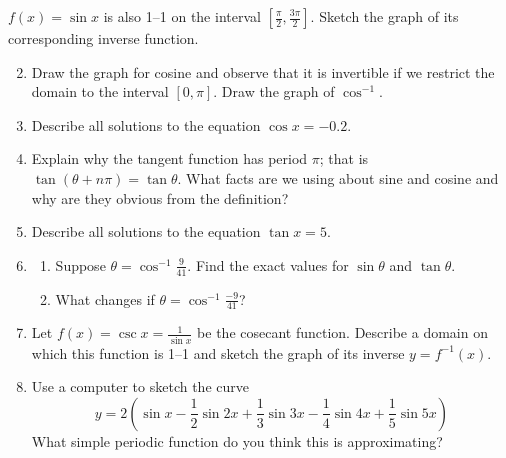 \goodbreak


\begin{exercises}
	\exstart $f(x)=\sin x$ is also 1--1 on the interval $[\frac\pi 2,\frac{3\pi}2]$. Sketch the graph of its corresponding inverse function.
	
	\begin{enumerate}\setcounter{enumi}{1}
	  \item Draw the graph for cosine and observe that it is invertible if we restrict the domain to the interval $[0,\pi]$. Draw the graph of $\cos^{-1}$.
	  
	  \item Describe all solutions to the equation $\cos x=-0.2$.
	  
	  \item Explain why the tangent function has period $\pi$; that is $\tan(\theta+n\pi)=\tan \theta$. What facts are we using about sine and cosine and why are they obvious from the definition?
	  
	  \item Describe all solutions to the equation $\tan x=5$.
	  
	  \item\begin{enumerate}
	    \item Suppose $\theta=\cos^{-1}\frac 9{41}$. Find the exact values for $\sin\theta$ and $\tan\theta$.
	    \item What changes if $\theta=\cos^{-1}\frac{-9}{41}$?
	  \end{enumerate} 
	  
	  \item Let $f(x)=\csc x=\frac 1{\sin x}$ be the cosecant function. Describe a domain on which this function is 1--1 and sketch the graph of its inverse $y=f^{-1}(x)$.
	  
	  \item Use a computer to sketch the curve
	  \[
	  	y=2\left(\sin x-\frac 12\sin 2x+\frac 13\sin 3x-\frac 14\sin 4x+\frac 15\sin 5x\right)
	  \]
	  What simple periodic function do you think this is approximating?
	\end{enumerate}
\end{exercises}

\clearpage



